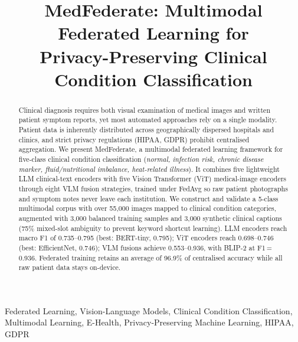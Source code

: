\documentclass[conference]{IEEEtran}
\begin{document}
\renewcommand{\arraystretch}{0.95}
\setlength{\abovecaptionskip}{4pt}
\setlength{\belowcaptionskip}{2pt}
\renewcommand{\dbltopfraction}{0.9}
\renewcommand{\topfraction}{0.9}

\title{MedFederate: Multimodal Federated Learning for\\
Privacy-Preserving Clinical Condition Classification}

\author{%
}

\maketitle

\begin{abstract}
Clinical diagnosis requires both visual examination of medical images and
written patient symptom reports, yet most automated approaches rely on a
single modality. Patient data is inherently distributed across geographically
dispersed hospitals and clinics, and strict privacy regulations (HIPAA,
GDPR) prohibit centralised aggregation.
We present MedFederate, a multimodal federated learning framework for
five-class clinical condition classification
(\textit{normal, infection risk, chronic disease marker, fluid/nutritional
imbalance, heat-related illness}).
It combines five lightweight LLM clinical-text encoders with five Vision
Transformer (ViT) medical-image encoders through eight VLM fusion
strategies, trained under FedAvg so raw patient photographs and symptom
notes never leave each institution.
We construct and validate a 5-class multimodal corpus with
over 55{,}000 images mapped to clinical condition categories,
augmented with 3,000 balanced training samples and 3,000 synthetic
clinical captions (75\% mixed-slot ambiguity to prevent keyword shortcut
learning).
LLM encoders reach macro F1 of 0.735--0.795 (best: BERT-tiny, 0.795);
ViT encoders reach 0.698--0.746 (best: EfficientNet, 0.746);
VLM fusions achieve 0.553--0.936, with BLIP-2 at F1\,=\,0.936.
Federated training retains an average of 96.9\% of centralised accuracy
while all raw patient data stays on-device.
\end{abstract}

\begin{IEEEkeywords}
Federated Learning, Vision-Language Models, Clinical Condition
Classification, Multimodal Learning, E-Health, Privacy-Preserving Machine
Learning, HIPAA, GDPR
\end{IEEEkeywords}
\end{document}
